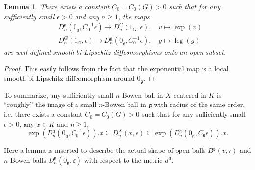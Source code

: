 \documentclass[reqno,12pt]{amsart}
\newtheorem{lemma}[theorem]{Lemma}
\theoremstyle{definition}
\numberwithin{equation}{section}
\newcommand{\Lg}{\mathfrak{g}}
\newcommand{\eps}{\varepsilon}
\begin{document}
{\begin{lemma}
    There exists a constant $C_0=C_0(G)>0$ such that for any sufficiently small $\epsilon>0$ and any $n\geq 1$, the maps
    \begin{equation*}
        \begin{aligned}
            &D_n^\Lg(0_\Lg,C_0^{-1}\epsilon)\to D_n^G(1_G,\epsilon),\quad v\mapsto \exp(v)\\
            &D_n^G(1_G,\epsilon)\to D_n^\Lg(0_\Lg,C_0^{-1}\epsilon),\quad g\mapsto \log(g)
        \end{aligned}
    \end{equation*}
    are well-defined smooth bi-Lipschitz diffeomorphisms onto an open subset.
\end{lemma}
\begin{proof}
    This easily follows from the fact that the exponential map is a local smooth bi-Lipschitz diffeomorphism around $0_\Lg$.
\end{proof}


To summarize, any sufficiently small $n$-Bowen ball in $X$ centered in $K$ is ``roughly'' the image of a small $n$-Bowen ball in $\Lg$ with radius of the same order, i.e. there exists a constant $C_0=C_0(G)>0$ such that for any sufficiently small $\epsilon>0$, any $x\in K$ and $n\geq 1$, $$
\exp(D^\Lg_n(0_\Lg,C_0^{-1}\epsilon)).x\subseteq D^X_n(x,\epsilon)\subseteq\exp(D^\Lg_n(0_\Lg,C_0\epsilon)).x.
$$

Here a lemma is inserted to describe the actual shape of open balls $B^\Lg(v,r)$ and $n$-Bowen balls $D^\Lg_n(0_\Lg,\eps)$ with respect to the metric $d^\Lg$.

}
\end{document}
